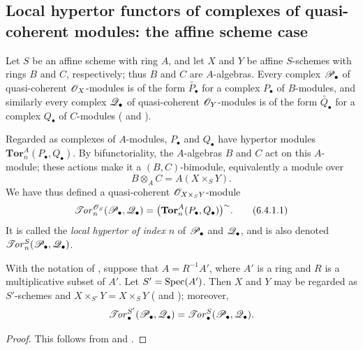 \subsection{Local hypertor functors of complexes of quasi-coherent modules: the affine scheme case}
\label{subsection:III.6.4}
\label{III.6.4}

\begin{env}[6.4.1]
\label{III.6.4.1}
Let $S$ be an affine scheme with ring $A$, and let $X$ and $Y$ be
affine $S$-schemes with rings $B$ and $C$, respectively; thus $B$
and $C$ are $A$-algebras.  Every complex $\mathscr{P}_\bullet$ of
quasi-coherent $\mathscr{O}_X$-modules is of the form
$\widetilde{P_\bullet}$ for a complex $P_\bullet$ of $B$-modules,
and similarly every complex $\mathscr{Q}_\bullet$ of quasi-coherent
$\mathscr{O}_Y$-modules is of the form $\widetilde{Q_\bullet}$ for a
complex $Q_\bullet$ of $C$-modules
( and ).

Regarded as complexes of $A$-modules, $P_\bullet$ and $Q_\bullet$
have hypertor modules
$\mathbf{Tor}_n^A(P_\bullet,Q_\bullet)$.  By bifunctoriality, the
$A$-algebras $B$ and $C$ act on this $A$-module; these actions make
it a $(B,C)$-bimodule, equivalently a module over
\[
  B\otimes_AC=A(X\times_SY).
\]
We have thus defined a quasi-coherent
$\mathscr{O}_{X\times_SY}$-module
\[
  \mathscr{T}\!\mathit{or}_n^{\mathscr{O}_S}(\mathscr{P}_\bullet,\mathscr{Q}_\bullet)
  =
  \bigl(\mathbf{Tor}_n^A(P_\bullet,Q_\bullet)\bigr)^{\sim}.
  \tag{6.4.1.1}\label{III.6.4.1.1}
\]
It is called the \emph{local hypertor of index $n$} of
$\mathscr{P}_\bullet$ and $\mathscr{Q}_\bullet$, and is also denoted
$\mathscr{T}\!\mathit{or}_n^S(\mathscr{P}_\bullet,\mathscr{Q}_\bullet)$.
\end{env}

\begin{lemma}[6.4.2]
\label{III.6.4.2}
With the notation of , suppose that
$A=R^{-1}A'$, where $A'$ is a ring and $R$ is a multiplicative
subset of $A'$.  Let $S'=\operatorname{Spec}(A')$.  Then $X$ and $Y$ may be
regarded as $S'$-schemes and
$X\times_{S'}Y=X\times_SY$
( and ); moreover,
\[
  \mathscr{T}\!\mathit{or}_\bullet^{S'}(\mathscr{P}_\bullet,\mathscr{Q}_\bullet)
  =
  \mathscr{T}\!\mathit{or}_\bullet^S(\mathscr{P}_\bullet,\mathscr{Q}_\bullet).
\]
\end{lemma}

\begin{proof}
This follows from  and .
\end{proof}

